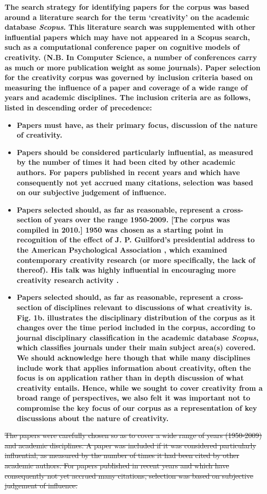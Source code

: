 \documentclass[10pt,letterpaper]{article}
\begin{document}
\textbf{The search strategy for identifying papers for the corpus was based around a literature search for the term `creativity' on the academic database {\em Scopus}. This literature search was supplemented with other influential papers which may have not appeared in a Scopus search, such as a computational conference paper on cognitive models of creativity. (N.B. In Computer Science, a number of conferences carry as much or more publication weight as some journals). Paper selection for the creativity corpus was governed by inclusion criteria based on measuring the influence of a paper and coverage of a wide range of years and academic disciplines. The inclusion criteria are as follows, listed in descending order of precedence: }
\begin{itemize}
\item \textbf{Papers must have, as their primary focus, discussion of the nature of creativity.}
\item \textbf{Papers should be considered particularly influential, as measured by the number of times it had been cited by other academic authors. For papers published in recent years and which have consequently not yet accrued many citations, selection was based on our subjective judgement of influence.}
\item \textbf{Papers selected should, as far as reasonable, represent a cross-section of years over the range 1950-2009. [The corpus was compiled in 2010.] 1950 was chosen as a starting point in recognition of the effect of J. P. Guilford's presidential address to the American Psychological Association \cite{guilford50}, which examined contemporary creativity research (or more specifically, the lack of thereof). His talk was highly influential in encouraging more creativity research activity \cite{kaufman09}. }
\item \textbf{Papers selected should, as far as reasonable, represent a cross-section of disciplines relevant to discussions of what creativity is. Fig. 1b. illustrates the disciplinary distribution of the corpus as it changes over the time period included in the corpus, according to journal disciplinary classification in the academic database {\em Scopus}, which classifies journals under their main subject area(s) covered. We should acknowledge here though that while many disciplines include work that applies information about creativity, often the focus is on application rather than in depth discussion of what creativity entails. Hence, while we sought to cover creativity from a broad range of perspectives, we also felt it was important not to compromise the key focus of our corpus as a representation of key discussions about the nature of creativity.}
\end{itemize}
\sout{The papers were carefully chosen so as to cover a wide range of years (1950-2009) and academic disciplines. A paper was included if it was considered particularly influential, as measured by the number of times it had been cited by other academic authors. For papers published in recent years and which have consequently not yet accrued many citations, selection was based on subjective judgement of influence.}
\end{document}
